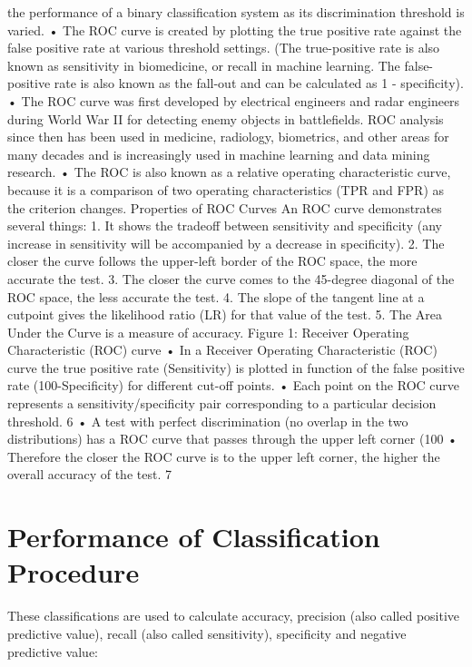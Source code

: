 \documentclass[a4paper,12pt]{article}
\begin{document}
the performance of a binary classification system as its discrimination threshold is varied.
• The ROC curve is created by plotting the true positive rate against the false positive rate at
various threshold settings. (The true-positive rate is also known as sensitivity in biomedicine,
or recall in machine learning. The false-positive rate is also known as the fall-out and can be
calculated as 1 - specificity).
• The ROC curve was first developed by electrical engineers and radar engineers during World
War II for detecting enemy objects in battlefields. ROC analysis since then has been used in
medicine, radiology, biometrics, and other areas for many decades and is increasingly used
in machine learning and data mining research.
• The ROC is also known as a relative operating characteristic curve, because it is a comparison
of two operating characteristics (TPR and FPR) as the criterion changes.
Properties of ROC Curves
An ROC curve demonstrates several things:
1. It shows the tradeoff between sensitivity and specificity (any increase in sensitivity will be
accompanied by a decrease in specificity).
2. The closer the curve follows the upper-left border of the ROC space, the more accurate the
test.
3. The closer the curve comes to the 45-degree diagonal of the ROC space, the less accurate the
test.
4. The slope of the tangent line at a cutpoint gives the likelihood ratio (LR) for that value of
the test.
5. The Area Under the Curve is a measure of accuracy.
Figure 1: Receiver Operating Characteristic (ROC) curve
• In a Receiver Operating Characteristic (ROC) curve the true positive rate (Sensitivity) is
plotted in function of the false positive rate (100-Specificity) for different cut-off points.
• Each point on the ROC curve represents a sensitivity/specificity pair corresponding to a
particular decision threshold.
6
• A test with perfect discrimination (no overlap in the two distributions) has a ROC curve that
passes through the upper left corner (100%
• Therefore the closer the ROC curve is to the upper left corner, the higher the overall accuracy
of the test.
7

\section{Performance of Classification Procedure}
	
	These classifications are used to calculate accuracy, precision (also called positive predictive value), recall (also called sensitivity), specificity and negative predictive value:
	
\end{document}
